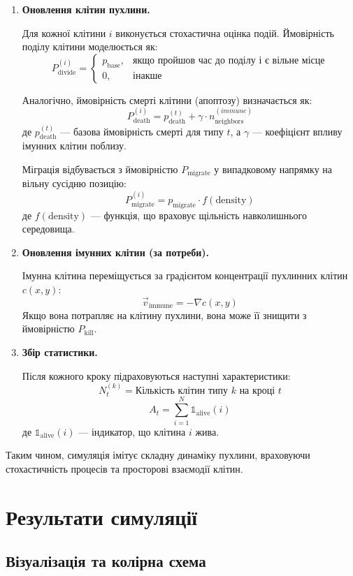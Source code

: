 \documentclass{article}
\begin{document}
\begin{enumerate}
  \item \textbf{Оновлення клітин пухлини.}

  Для кожної клітини $i$ виконується стохастична оцінка подій. Ймовірність поділу клітини моделюється як:
\[
P_\text{divide}^{(i)} =
\begin{cases}
  p_\text{base}, & \text{якщо пройшов час до поділу і є вільне місце} \\
  0, & \text{інакше}
\end{cases}
\]

  Аналогічно, ймовірність смерті клітини (апоптозу) визначається як:
  \[
    P_\text{death}^{(i)} = p_\text{death}^{(t)} + \gamma \cdot n_\text{neighbors}^{(immune)}
  \]
  де $p_\text{death}^{(t)}$ --- базова ймовірність смерті для типу $t$, а $\gamma$ --- коефіцієнт впливу імунних клітин поблизу.

  Міграція відбувається з ймовірністю $P_\text{migrate}$ у випадковому напрямку на вільну сусідню позицію:
  \[
    P_\text{migrate}^{(i)} = p_\text{migrate} \cdot f(\text{density})
  \]
  де $f(\text{density})$ --- функція, що враховує щільність навколишнього середовища.

  \item \textbf{Оновлення імунних клітин (за потреби).}

  Імунна клітина переміщується за градієнтом концентрації пухлинних клітин $c(x,y)$:
  \[
    \vec{v}_\text{immune} = -\nabla c(x, y)
  \]
  Якщо вона потрапляє на клітину пухлини, вона може її знищити з ймовірністю $P_\text{kill}$.

  \item \textbf{Збір статистики.}

  Після кожного кроку підраховуються наступні характеристики:
  \[
    N_t^{(k)} = \text{Кількість клітин типу } k \text{ на кроці } t
  \]
  \[
    A_t = \sum_{i=1}^N \mathbb{1}_{\text{alive}}(i)
  \]
  де $\mathbb{1}_{\text{alive}}(i)$ --- індикатор, що клітина $i$ жива.
\end{enumerate}

Таким чином, симуляція імітує складну динаміку пухлини, враховуючи стохастичність процесів та просторові взаємодії клітин.
\section{Результати симуляції}

\subsection{Візуалізація та колірна схема}
\end{document}
